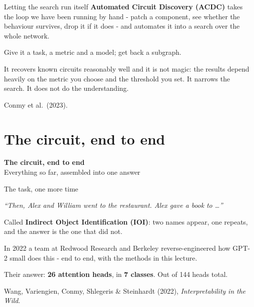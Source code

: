 \documentclass[aspectratio=169]{beamer}
\newcommand{\keybox}[1]{%
  \begin{tcolorbox}[colback=armblue!8, colframe=armblue, boxrule=0.6pt, arc=2pt]
  #1
  \end{tcolorbox}}
\newcommand{\watchbox}[1]{%
  \begin{tcolorbox}[colback=armorange!12, colframe=armorange, boxrule=0.6pt, arc=2pt]
  #1
  \end{tcolorbox}}
\newcommand{\promptbox}[1]{%
  \begin{center}
  \begin{tcolorbox}[colback=lightbg, colframe=gray, boxrule=0.5pt, arc=2pt, width=0.88\textwidth]
    \centering\textit{#1}
  \end{tcolorbox}
  \end{center}}
\newcommand{\sectiontransition}[2]{%
  \begin{frame}[plain]
    \vfill
    \begin{center}
      {\Huge\bfseries\color{popblue} #1}\\[1.1em]
      {\large #2}
    \end{center}
    \vfill
  \end{frame}}
\begin{document}
\begin{frame}{Letting the search run itself}
  \vspace{0.8em}
  \textbf{Automated Circuit Discovery (ACDC)} takes the loop we have been running by hand -
  patch a component, see whether the behaviour survives, drop it if it does - and automates it
  into a search over the whole network.

  \vspace{0.9em}
  Give it a task, a metric and a model; get back a subgraph.

  \vspace{0.9em}
  \watchbox{It recovers known circuits reasonably well and it is not magic: the results depend
  heavily on the metric you choose and the threshold you set. It narrows the search. It does not
  do the understanding.}

  \vspace{0.5em}
  {\footnotesize Conmy et al.\ (2023).}
\end{frame}

\section{The circuit, end to end}
\sectiontransition{The circuit, end to end}{Everything so far, assembled into one answer}

\begin{frame}{The task, one more time}
  \vspace{0.6em}
  \promptbox{``Then, Alex and William went to the restaurant. Alex gave a book to \ldots''}

  \vspace{0.3em}
  Called \textbf{Indirect Object Identification (IOI)}: two names appear, one repeats, and the
  answer is the one that did not.

  \vspace{0.9em}
  In 2022 a team at Redwood Research and Berkeley reverse-engineered how GPT-2 small does this -
  end to end, with the methods in this lecture.

  \vspace{0.8em}
  \keybox{Their answer: \textbf{26 attention heads}, in \textbf{7 classes}. Out of 144 heads
  total.}

  \vspace{0.5em}
  {\footnotesize Wang, Variengien, Conmy, Shlegeris \& Steinhardt (2022),
  \emph{Interpretability in the Wild}.}
\end{frame}
\end{document}
